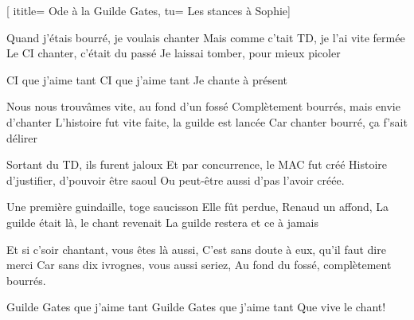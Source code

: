  [
ititle= {Ode à la Guilde Gates},
tu= {Les stances à Sophie}]

\beginverse
Quand j'étais bourré, je voulais chanter
Mais comme c'tait TD, je l'ai vite fermée
Le CI chanter, c'était du passé 
Je laissai tomber, pour mieux picoler
\endverse

\beginchorus
CI que j'aime tant
CI que j'aime tant
Je chante à présent
\endchorus

\beginverse
Nous nous trouvâmes vite, au fond d'un fossé
Complètement bourrés, mais envie d'chanter
L'histoire fut vite faite, la guilde est lancée
Car chanter bourré, ça f'sait délirer
\endverse

\beginverse
Sortant du TD, ils furent jaloux
Et par concurrence, le MAC fut créé
Histoire d'justifier, d'pouvoir être saoul
Ou peut-être aussi d'pas l'avoir créée.
\endverse

\beginverse
Une première guindaille, toge saucisson
Elle fût perdue, Renaud un affond,
La guilde était là, le chant revenait
La guilde restera et ce à jamais
\endverse

\beginverse
Et si c'soir chantant, vous êtes là aussi,
C'est sans doute à eux, qu'il faut dire merci
Car sans dix ivrognes, vous aussi seriez,
Au fond du fossé, complètement bourrés.
\endverse

\beginchorus
Guilde Gates que j'aime tant
Guilde Gates que j'aime tant
Que vive le chant!
\endverse

\endsong